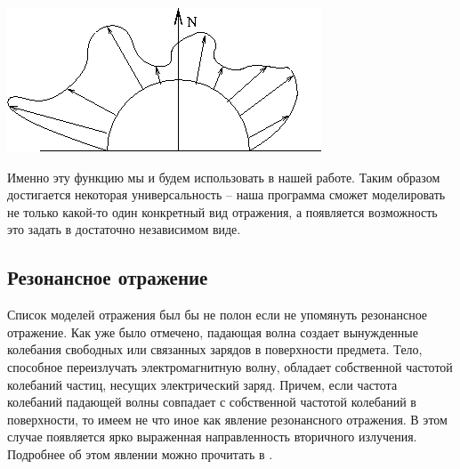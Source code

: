\begin{center}
\includegraphics[width=0.45\linewidth]{dfo.png}
\end{center}

Именно эту функцию мы и будем использовать в нашей работе. Таким образом достигается некоторая универсальность -- наша программа сможет моделировать не только какой-то один конкретный вид отражения, а появляется возможность это задать в достаточно независимом виде. 

\subsection*{Резонансное отражение}

Список моделей отражения был бы не полон если не упомянуть резонансное отражение. Как уже было отмечено, падающая волна создает вынужденные колебания свободных или связанных зарядов в поверхности предмета. Тело, способное переизлучать электромагнитную волну, обладает собственной частотой колебаний частиц, несущих электрический заряд. Причем, если частота колебаний падающей волны совпадает с собственной частотой колебаний в поверхности, то имеем не что иное как явление резонансного отражения. В этом случае появляется ярко выраженная направленность вторичного излучения. Подробнее об этом явлении можно прочитать в \cite{radiolocation}.


